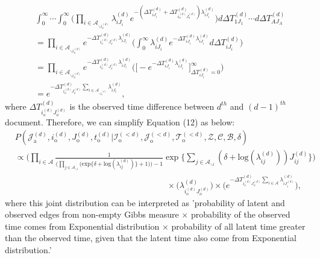 \documentclass[a4paper]{article}
\begin{document}
\begin{equation}
\begin{aligned}
&\int_{0}^\infty\cdots\int_{0}^\infty \Big(\prod_{i\in \mathcal{A}_{\backslash i_o^{(d)}}} \lambda^{(d)}_{iJ_i}e^{-(\Delta T^{(d)}_{iJ_i} + \Delta T^{(d)}_{i_o^{(d)}J_o^{(d)}})\lambda^{(d)}_{iJ_i}} \Big)d\Delta T^{(d)}_{1J_1}\cdots d\Delta T^{(d)}_{AJ_A}\\&
= \prod_{i\in \mathcal{A}_{\backslash i_o^{(d)}}} e^{- \Delta T^{(d)}_{i_o^{(d)}J_o^{(d)}}\lambda^{(d)}_{iJ_i}} \Big(\int_{0}^\infty \lambda^{(d)}_{iJ_i}e^{-\Delta T^{(d)}_{iJ_i} \lambda^{(d)}_{iJ_i}}  d\Delta T^{(d)}_{iJ_i}\Big)
\\& =\prod_{i\in \mathcal{A}_{\backslash i_o^{(d)}}} e^{- \Delta T^{(d)}_{i_o^{(d)}J_o^{(d)}}\lambda^{(d)}_{iJ_i}} \Big(\Big [ - e^{-\Delta T^{(d)}_{iJ_i} \lambda^{(d)}_{iJ_i}}\Big]_{\Delta T^{(d)}_{iJ_i}  = 0} ^{\infty}\Big)
\\& = e^{- \Delta T^{(d)}_{i_o^{(d)}J_o^{(d)}}\sum_{i\in \mathcal{A}_{\backslash i_o^{(d)}}}\lambda^{(d)}_{iJ_i}},
\end{aligned}
\end{equation}
where $\Delta T^{(d)}_{i_o^{(d)}J_o^{(d)}}$ is the observed time difference between $d^{th}$ and $(d-1)^{th}$ document.
Therefore, we can simplify Equation (12) as below:
  \begin{equation}
  \begin{aligned}
  &P(\mathcal{J}^{(d)}_{\mbox{a}}, i^{(d)}_{\mbox{o}}, J^{(d)}_{\mbox{o}}, t^{(d)}_{\mbox{o}} |\mathcal{I}^{(<d)}_{\mbox{o}}, \mathcal{J}^{(<d)}_{\mbox{o}}, \mathcal{T}^{(<d)}_{\mbox{o}}, \mathcal{Z}, \mathcal{C}, \mathcal{B}, \delta)\\&\propto \Big(\prod_{i\in \mathcal{A}}\frac{1}{\Big(\prod_{j \in \mathcal{A}_{\backslash i}} \Big(\mbox{exp}\{\delta+\mbox{log}(\lambda_{ij}^{(d)})\} + 1\Big)\Big)-1}\exp\Big\{ \sum_{j \in \mathcal{A}_{\backslash i}} (\delta+\mbox{log}(\lambda_{ij}^{(d)}))J_{ij}^{(d)} \Big\}\Big)\\&\quad\quad\quad\quad\quad\quad\quad\quad\quad\quad\quad\quad\quad\quad\quad\quad\quad\quad\times \Big(\lambda^{(d)}_{i_o^{(d)}J_{o}^{(d)}}\Big)\times\Big( e^{-\Delta T^{(d)}_{i_o^{(d)}J_o^{(d)}}\sum\limits_{i\in \mathcal{A}}\lambda^{(d)}_{iJ^{(d)}_{i}}}\Big),
  \end{aligned}
  \end{equation}
where this joint distribution can be interpreted as 'probability of latent and observed edges from non-empty Gibbs measure $\times$ probability of the observed time comes from Exponential distribution $\times$ probability of all latent time greater than the observed time, given that the latent time also come from Exponential distribution.'
\end{document}
